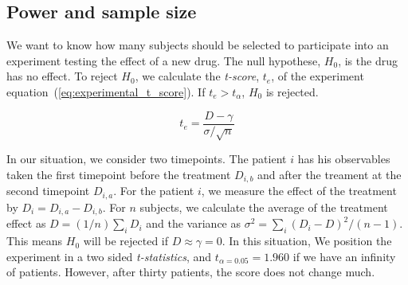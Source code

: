 \documentclass[final, paper=letter,5p,times,twocolumn]{elsarticle}
\theoremstyle{definition}
\begin{document}
%
%
%
%
%
%
%
%

\subsection{Power and sample size}

We want to know how many subjects should be selected to participate into an experiment testing the effect of a new drug. The null hypothese, $H_{0}$, is the drug has no effect. To reject $H_{0}$, we calculate the {\it t-score}, $t_{e}$, of the experiment equation~(\ref{eq:experimental_t_score}). If $t_{e} > t_{\alpha}$, $H_{0}$ is rejected. 

\begin{equation}
  t_{e} = \frac{D - \gamma}{\sigma / \sqrt{n}}
  \label{eq:experimental_t_score}
\end{equation}

In our situation, we consider two timepoints. The patient $i$ has his observables taken the first timepoint before the treatment $D_{i,b}$ and after the treament at the second timepoint $D_{i,a}$. For the patient $i$, we measure the effect of the treatment by $D_{i} = D_{i,a} - D_{i,b}$. For $n$ subjects, we calculate the average of the treatment effect as $D = (1/n)\sum_{i} D_{i}$ and the variance as $\sigma^{2} = \sum_{i} (D_{i} - D)^{2} / (n-1)$. This means $H_{0}$ will be rejected if $D \approx \gamma = 0$. In this situation, We position the experiment in a two sided {\it t-statistics}, and $t_{\alpha = 0.05} = 1.960$ if we have an infinity of patients. However, after thirty patients, the score does not change much.
\end{document}
